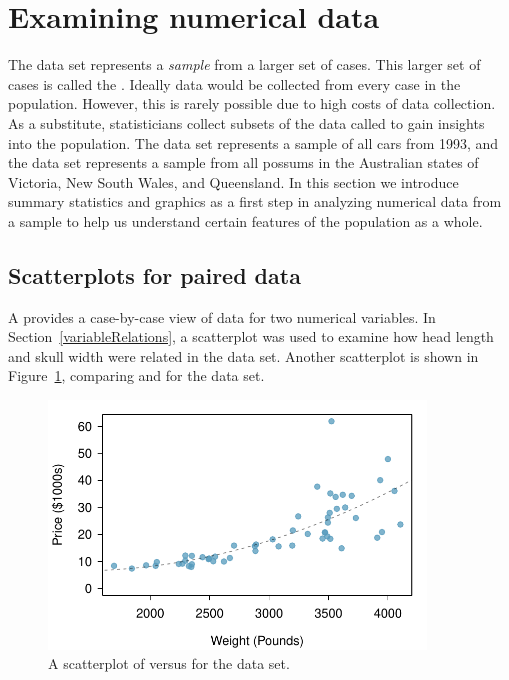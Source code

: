 

\section{Examining numerical data}
\label{numericalData}

The  data set represents a \emph{sample} from a larger set of cases. This larger set of cases is called the . Ideally data would be collected from every case in the population. However, this is rarely possible due to high costs of data collection. As a substitute, statisticians collect subsets of the data called  to gain insights into the population. The  data set represents a sample of all cars from 1993, and the  data set represents a sample from all possums in the Australian states of Victoria, New South Wales, and Queensland. In this section we introduce summary statistics and graphics as a first step in analyzing numerical data from a sample to help us understand certain features of the population as a whole.

\subsection{Scatterplots for paired data}
\label{scatterPlots}

A  provides a case-by-case view of data for two numerical variables. In Section~\ref{variableRelations}, a scatterplot was used to examine how head length and skull width were related in the  data set. Another scatterplot is shown in Figure~\ref{carsPriceVsWeight}, comparing  and  for the  data set.
\begin{figure}[h]
   \centering
   \includegraphics[height=2.6in]{01/figures/carsPriceVsWeight/carsPriceVsWeight}
   \caption{A scatterplot of  versus  for the  data set.}
   \label{carsPriceVsWeight}
\end{figure}

